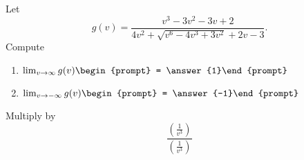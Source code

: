 \documentclass{ximera}
\author{Bart Snapp}
\begin{document}
\begin{exercise}
Let 
\[
g(v) = \frac{v^3-3 v^2-3 v+2}{4 v^2+\sqrt{v^6-4 v^3+3 v^2}+2 v-3}.
\]
Compute
\begin{enumerate}
\item $\lim_{v\to \infty} g(v) \begin{prompt} = \answer{1}\end{prompt}$
\item $\lim_{v\to -\infty}g(v) \begin{prompt} = \answer{-1}\end{prompt}$
\end{enumerate}
\begin{hint}
Multiply by
\[
\frac{\left(\frac{1}{v^3}\right)}{\left(\frac{1}{v^3}\right)}
\]
\end{hint}
\end{exercise}
\end{document}

